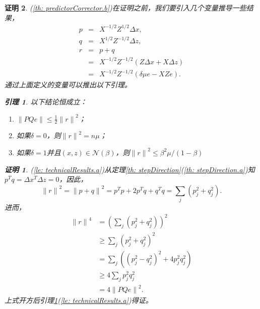 \documentclass{ctexart}
\numberwithin{equation}{section} %
\newtheorem{lemma}{引理}[section]
\newtheorem*{Proof}{证明}
\begin{document}
\begin{Proof}
	(\ref{th: predictorCorrector.b})在证明之前，我们要引入几个变量推导一些结果，
	\begin{eqnarray}
		p & = & X^{-1/2}Z^{1/2}\Delta x, \nonumber \\
		q & = & X^{1/2}Z^{-1/2}\Delta z, \nonumber \\
		r & = & p + q \nonumber \\
		  & = & X^{-1/2}Z^{-1/2}\left(Z\Delta x + X\Delta z\right) \nonumber \\
		  & = & X^{-1/2}Z^{-1/2}\left(\delta\mu e - XZe\right). \label{Eq: transVarible}
	\end{eqnarray}
	通过上面定义的变量可以推出以下引理。
	\begin{lemma}
		\label{le: technicalResults}
		以下结论恒成立：
		\begin{enumerate}[(1)]
			\item \label{le: technicalResults.a} $ \parallel PQe \parallel \leq \frac{1}{2}{\parallel r \parallel}^2 $；
			\item \label{le: technicalResults.b} 如果$ \delta = 0 $，则$ {\parallel r \parallel}^2 = n\mu $；
			\item \label{le: technicalResults.c} 如果$ \delta = 1 $并且$ \left(x, z\right) \in \mathcal{N}\left(\beta\right) $，则$ {\parallel r \parallel}^2 \leq {\beta}^2\mu/\left(1 - \beta\right) $
		\end{enumerate}
	\end{lemma}
	\begin{Proof}
		(\ref{le: technicalResults.a})从定理\ref{th: stepDirection}(\ref{th: stepDirection.a})知$ p^Tq = \Delta x^T\Delta z = 0 $，因此，
		\begin{equation}
			{\parallel r \parallel}^2 = {\parallel p + q \parallel}^2 = p^Tp + 2p^Tq + q^Tq = \sum_j \left(p_j^2 + q_j^2\right).  \nonumber
		\end{equation}
		进而，
		\begin{equation}
			\begin{aligned}
				{\parallel r \parallel}^4 & = {\left(\sum_j \left(p_j^2 + q_j^2\right)\right)}^2 \\
				& \geq \sum_j {\left(p_j^2 + q_j^2\right)}^2 \\
				& = \sum_j \left({\left(p_j^2 - q_j^2\right)}^2 + 4p_j^2q_j^2\right) \\
				& \geq 4\sum_j p_j^2q_j^2 \\
				& = 4{\parallel PQe \parallel}^2.
			\end{aligned} \nonumber
		\end{equation}
		上式开方后引理\ref{le: technicalResults}(\ref{le: technicalResults.a})得证。
		

\end{Proof}
\end{Proof}
\end{document}
